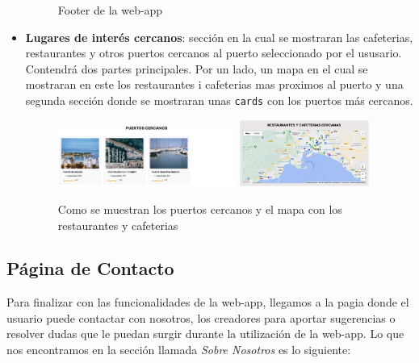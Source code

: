 \documentclass{article}
\begin{document}
\begin{itemize}
\begin{figure}[ht]
        \caption{Footer de la web-app}
    \end{figure}
    \item \textbf{Lugares de interés cercanos}: sección en la cual se mostraran las cafeterias, restaurantes y otros puertos cercanos al puerto seleccionado por el ususario. Contendrá dos partes principales. Por un lado, un mapa en el cual se mostraran en este los restaurantes i cafeterias mas proximos al puerto y una segunda sección donde se mostraran unas \texttt{cards} con los puertos más cercanos.
    \begin{figure}[ht]
        \centering
        \includegraphics[width=0.55\textwidth]{images/puertosCercanos.png}
        \includegraphics[width=0.4\textwidth]{images/resCafcercanas.png}
        \caption{Como se muestran los puertos cercanos y el mapa con los restaurantes y cafeterias}
    \end{figure}
\end{itemize}

\subsection{Página de Contacto}
Para finalizar con las funcionalidades de la web-app, llegamos a la pagia donde el usuario puede contactar con nosotros, los creadores para aportar sugerencias o resolver dudas que le puedan surgir durante la utilización de la web-app. Lo que nos encontramos en la sección llamada \textit{Sobre Nosotros} es lo siguiente:
\end{document}
